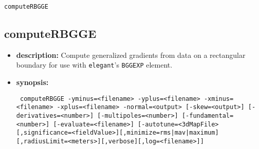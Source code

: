 \documentclass[11pt]{article}
\begin{document}
\newpage
\begin{center}{\Large\verb|computeRBGGE|}\end{center}
\subsection{computeRBGGE}

\begin{itemize}
\item {\bf description:}  Compute generalized gradients \cite{Venturini-NIMA427-387} from data on a rectangular
boundary \cite{Mitchell-2007} for use with {\tt elegant}'s \verb|BGGEXP| element.

\item {\bf synopsis:}
\begin{flushleft}{\tt
computeRBGGE -yminus=<filename> -yplus=<filename> -xminus=<filename> -xplus=<filename>
   -normal=<output> [-skew=<output>] [-derivatives=<number>] [-multipoles=<number>] [-fundamental=<number>]
   [-evaluate=<filename>]
   [-autotune=<3dMapFile>[,significance=<fieldValue>][,minimize={rms|mav|maximum}][,radiusLimit=<meters>][,verbose][,log=<filename>]]
}\end{flushleft}


\end{itemize}
\end{document}
